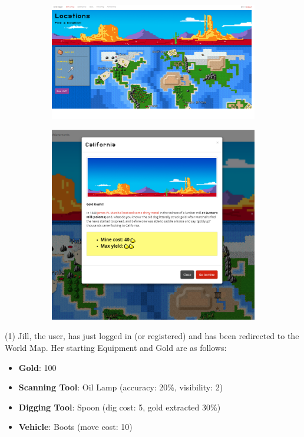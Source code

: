 \documentclass{mproj}
\begin{document}
\begin{figure}[!h]
        \centering
        \begin{subfigure} [h] {0.6\textwidth}
                \centering
                \includegraphics [width=1\textwidth] {worldmap.png}
        \end{subfigure}
        \space
        \space
        \begin{subfigure} [h] {0.3\textwidth}
                \centering
                \includegraphics [width=1\textwidth] {cali.png}
        \end{subfigure}
\end{figure}

(1) Jill, the user, has just logged in (or registered) and has been redirected to the World Map. Her starting Equipment and Gold are as follows:
\begin{itemize}
	\item \textbf{Gold}: 100
  	\item \textbf{Scanning Tool}:  Oil Lamp (accuracy: 20\%, visibility: 2)
  	\item \textbf{Digging Tool}: Spoon (dig cost: 5, gold extracted 30\%)
	\item \textbf{Vehicle}: Boots (move cost: 10)
\end{itemize} 
\end{document}
